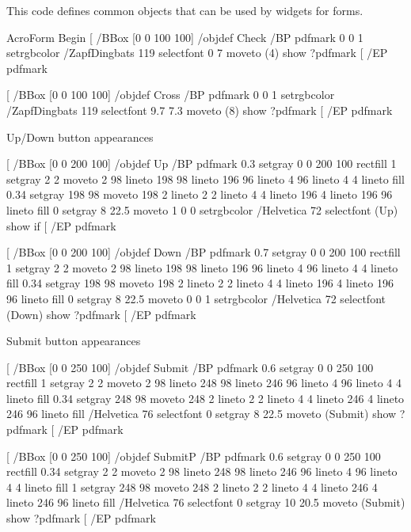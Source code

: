 \documentclass[letterpaper,12pt,english,openany,oneside]{sphinxmanual}
\begin{document}
This code defines common objects that can be used by widgets for forms.

\begin{sphinxVerbatim}[commandchars=\\\{\}]
  \PYGZpc{} AcroForm Begin
  [ /BBox [0 0 100 100] /\PYGZus{}objdef \PYGZob{}Check\PYGZcb{} /BP pdfmark
      \PYGZob{}0 0 1 setrgbcolor /ZapfDingbats 119 selectfont 0 7 moveto (4) show\PYGZcb{}
  ?pdfmark
  [ /EP pdfmark

  [ /BBox [0 0 100 100] /\PYGZus{}objdef \PYGZob{}Cross\PYGZcb{} /BP pdfmark
      \PYGZob{}0 0 1 setrgbcolor /ZapfDingbats 119 selectfont 9.7 7.3 moveto (8) show\PYGZcb{}
  ?pdfmark
  [ /EP pdfmark


  \PYGZpc{} Up/Down button appearances

  [ /BBox [0 0 200 100] /\PYGZus{}objdef \PYGZob{}Up\PYGZcb{} /BP pdfmark
      \PYGZob{}
      0.3 setgray 0 0 200 100 rectfill 1 setgray 2 2 moveto
      2 98 lineto 198 98 lineto 196 96 lineto 4 96 lineto 4 4 lineto fill
      0.34 setgray 198 98 moveto
      198 2 lineto 2 2 lineto 4 4 lineto 196 4 lineto 196 96 lineto fill
      0 setgray 8 22.5 moveto 1 0 0 setrgbcolor /Helvetica 72 selectfont (Up) show
  \PYGZcb{}
if
[ /EP pdfmark

[ /BBox [0 0 200 100] /\PYGZus{}objdef \PYGZob{}Down\PYGZcb{} /BP pdfmark
    \PYGZob{}
      0.7 setgray 0 0 200 100 rectfill 1 setgray 2 2 moveto
      2 98 lineto 198 98 lineto 196 96 lineto 4 96 lineto 4 4 lineto fill
      0.34 setgray 198 98 moveto
      198 2 lineto 2 2 lineto 4 4 lineto 196 4 lineto 196 96 lineto fill
      0 setgray 8 22.5 moveto 0 0 1 setrgbcolor /Helvetica 72 selectfont (Down) show
      \PYGZcb{}
  ?pdfmark
  [ /EP pdfmark

  \PYGZpc{} Submit button appearances

  [ /BBox [0 0 250 100] /\PYGZus{}objdef \PYGZob{}Submit\PYGZcb{} /BP pdfmark
      \PYGZob{}
      0.6 setgray 0 0 250 100 rectfill 1 setgray 2 2 moveto
      2 98 lineto 248 98 lineto 246 96 lineto 4 96 lineto 4 4 lineto fill
      0.34 setgray 248 98 moveto
      248 2 lineto 2 2 lineto 4 4 lineto 246 4 lineto 246 96 lineto fill
      /Helvetica 76 selectfont 0 setgray 8 22.5 moveto (Submit) show
      \PYGZcb{}
  ?pdfmark
  [ /EP pdfmark

  [ /BBox [0 0 250 100] /\PYGZus{}objdef \PYGZob{}SubmitP\PYGZcb{} /BP pdfmark
      \PYGZob{}
      0.6 setgray 0 0 250 100 rectfill 0.34 setgray 2 2 moveto
      2 98 lineto 248 98 lineto 246 96 lineto 4 96 lineto 4 4 lineto fill
      1 setgray 248 98 moveto
      248 2 lineto 2 2 lineto 4 4 lineto 246 4 lineto 246 96 lineto fill
      /Helvetica 76 selectfont 0 setgray 10 20.5 moveto (Submit) show
      \PYGZcb{}
  ?pdfmark
  [ /EP pdfmark
\end{sphinxVerbatim}
\end{document}
